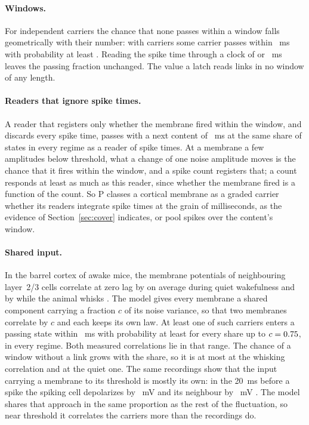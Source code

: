 \documentclass[12pt]{article}
\begin{document}
\paragraph{Windows.} For independent carriers the chance that none passes within
a window falls geometrically with their number: with \uOccCarriersMid{} carriers
some carrier passes within \uOccContentShortMs{}~ms with probability at least
\uOccLinkMidShort{}. Reading the spike time through a clock of
\uOccLatchShortMs{} or \uOccLatchLongMs{}~ms leaves the passing fraction
unchanged. The value a latch reads links in no window of any length.

\paragraph{Readers that ignore spike times.} A reader that registers only whether
the membrane fired within the window, and discards every spike time, passes with
a next content of \uOccNextShort{}~ms at the same share of states in every
regime as a reader of spike times. At a membrane a few amplitudes below
threshold, what a change of one noise amplitude moves is the chance that it
fires within the window, and a spike count registers that; a count responds at
least as much as this reader, since whether the membrane fired is a function of
the count. So P classes a cortical membrane as a graded carrier whether its
readers integrate spike times at the grain of milliseconds, as the evidence of
Section~\ref{sec:cover} indicates, or pool spikes over the content's window.

\paragraph{Shared input.} In the barrel cortex of awake mice, the membrane
potentials of neighbouring layer~2/3 cells correlate at zero lag by
\ueVmCorrelationQuiet{} on average during quiet wakefulness and by
\ueVmCorrelationWhisk{} while the animal whisks \citep{poulet2008}. The model
gives every membrane a shared component carrying a fraction $c$ of its noise
variance, so that two membranes correlate by $c$ and each keeps its own law. At
least one of \uOccCarriersMid{} such carriers enters a passing state within
\uOccContentLongMs{}~ms with probability at least \uCorLinkMidTol{} for every
share up to $c=0.75$, in every regime. Both measured correlations lie in
that range. The chance of a window without a link grows with the share, so it
is at most \uCorMissB{} at the whisking correlation and \uCorMissC{} at the
quiet one. The same recordings show that the input carrying a membrane to its
threshold is mostly its own: in the 20~ms before a spike the spiking cell
depolarizes by \uePreSpikeMv{}~mV and its neighbour by
\ueNeighbourPreSpikeMv{}~mV \citep{poulet2008}. The model shares that approach
in the same proportion as the rest of the fluctuation, so near threshold it
correlates the carriers more than the recordings do.
\end{document}
